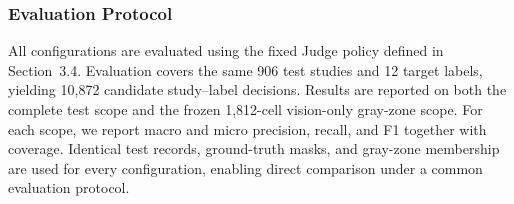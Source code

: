\subsubsection{Evaluation Protocol}

All configurations are evaluated using the fixed Judge policy defined in Section~3.4. Evaluation covers the same 906 test studies and 12 target labels, yielding 10,872 candidate study--label decisions. Results are reported on both the complete test scope and the frozen 1,812-cell vision-only gray-zone scope. For each scope, we report macro and micro precision, recall, and F1 together with coverage. Identical test records, ground-truth masks, and gray-zone membership are used for every configuration, enabling direct comparison under a common evaluation protocol.
